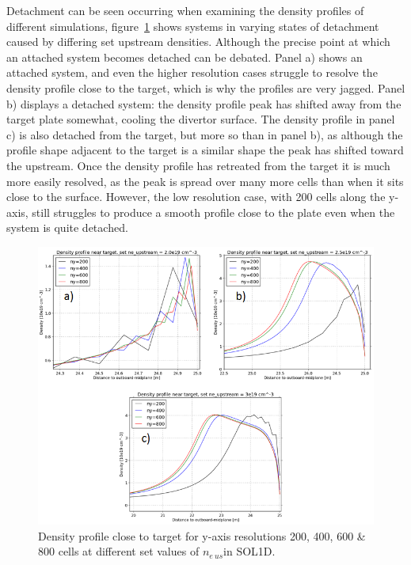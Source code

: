 \documentclass[11pt]{article}  %
\providecommand{\neus}{$n_{e~us}$} %
\begin{document}
Detachment can be seen occurring when examining the density profiles of different simulations, figure~\ref{figneprofneusALLtriang} shows systems in varying states of detachment caused by differing set upstream densities. Although the precise point at which an attached system becomes detached can be debated. Panel a) shows an attached system, and even the higher resolution cases struggle to resolve the density profile close to the target, which is why the profiles are very jagged. Panel b) displays a detached system: the density profile peak has shifted away from the target plate somewhat, cooling the divertor surface. The density profile in panel c) is also detached from the target, but more so than in panel b), as although the profile shape adjacent to the target is a similar shape the peak has shifted toward the upstream. Once the density profile has retreated from the target it is much more easily resolved, as the peak is spread over many more cells than when it sits close to the surface. However, the low resolution case, with 200 cells along the y-axis, still struggles to produce a smooth profile close to the plate even when the system is quite detached. 

\begin{figure}
\includegraphics[scale=0.5]{Figures/sol1d/neprofneusALLtriang.png}
\centering
\caption{Density profile close to target for y-axis resolutions 200, 400, 600 \& 800 cells at different set values of \neus in SOL1D.}\label{figneprofneusALLtriang}
\end{figure}
\end{document}
